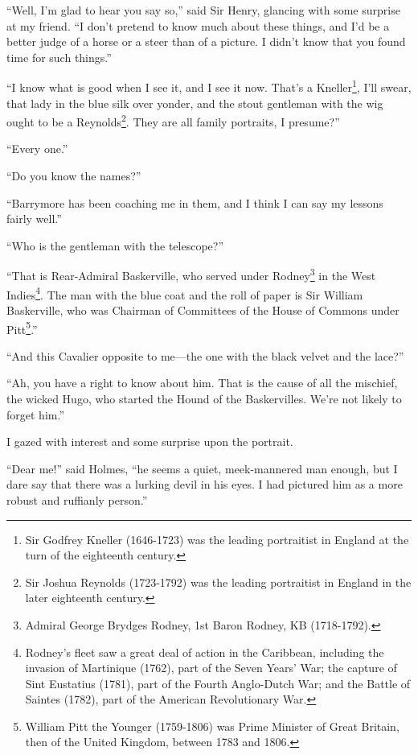 \documentclass[paper=a5,BCOR=7mm,twoside,DIV=calc,12pt,usegeometry,openany,chapterprefix,endperiod,headings=big]{scrbook} %
\begin{document}
\enquote{Well, I'm glad to hear you say so,} said Sir Henry, glancing with some surprise at my friend. \enquote{I don't pretend to know much about these things, and I'd be a better judge of a horse or a steer than of a picture. I didn't know that you found time for such things.}

\enquote{I know what is good when I see it, and I see it now. That's a Kneller\footnote{Sir Godfrey Kneller (1646-1723) was the leading portraitist in England at the turn of the eighteenth century.}, I'll swear, that lady in the blue silk over yonder, and the stout gentleman with the wig ought to be a Reynolds\footnote{Sir Joshua Reynolds (1723-1792) was the leading portraitist in England in the later eighteenth century.}. They are all family portraits, I presume?}

\enquote{Every one.}

\enquote{Do you know the names?}

\enquote{Barrymore has been coaching me in them, and I think I can say my lessons fairly well.}

\enquote{Who is the gentleman with the telescope?}

\enquote{That is Rear-Admiral Baskerville, who served under Rodney\footnote{Admiral George Brydges Rodney, 1st Baron Rodney, KB (1718-1792).} in the West Indies\footnote{Rodney's fleet saw a great deal of action in the Caribbean, including the invasion of Martinique (1762), part of the Seven Years' War; the capture of Sint Eustatius (1781), part of the Fourth Anglo-Dutch War; and the Battle of Saintes (1782), part of the American Revolutionary War.}. The man with the blue coat and the roll of paper is Sir William Baskerville, who was Chairman of Committees of the House of Commons under Pitt\footnote{William Pitt the Younger (1759-1806) was Prime Minister of Great Britain, then of the United Kingdom, between 1783 and 1806.}.}

\enquote{And this Cavalier opposite to me---the one with the black velvet and the lace?}

\enquote{Ah, you have a right to know about him. That is the cause of all the mischief, the wicked Hugo, who started the Hound of the Baskervilles. We're not likely to forget him.}

I gazed with interest and some surprise upon the portrait.

\enquote{Dear me!} said Holmes, \enquote{he seems a quiet, meek-mannered man enough, but I dare say that there was a lurking devil in his eyes. I had pictured him as a more robust and ruffianly person.}
\end{document}
